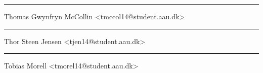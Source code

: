 \begin{minipage}[b]{0.45\textwidth}
 \centering
 \rule{\textwidth}{0.5pt}\smallbreak
  Thomas Gwynfryn McCollin \smallbreak
 {\footnotesize <tmccol14@student.aau.dk>}
\end{minipage}
\hfill
\begin{minipage}[b]{0.45\textwidth}
 \centering
 \rule{\textwidth}{0.5pt}\smallbreak
  Thor Steen Jensen\smallbreak
 {\footnotesize <tjen14@student.aau.dk>}
\end{minipage}
\hfill
\vspace{3\baselineskip}

\begin{minipage}[b]{0.45\textwidth}
 \centering
 \rule{\textwidth}{0.5pt}\smallbreak
  Tobias Morell\smallbreak
 {\footnotesize <tmorel14@student.aau.dk>}
\end{minipage}
\hfill
